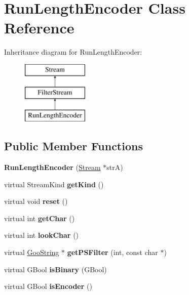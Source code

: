 \hypertarget{class_run_length_encoder}{}\section{Run\+Length\+Encoder Class Reference}
\label{class_run_length_encoder}
Inheritance diagram for Run\+Length\+Encoder\+:\begin{figure}[H]
\begin{center}
\leavevmode
\includegraphics[height=3.000000cm]{class_run_length_encoder}
\end{center}
\end{figure}
\subsection*{Public Member Functions}
\begin{DoxyCompactItemize}
\item 
\mbox{\label{class_run_length_encoder_ae3e57455ae4ceec38435f9ddc8ce8c31}} 
{\bfseries Run\+Length\+Encoder} (\hyperlink{class_stream}{Stream} $\ast$strA)
\item 
\mbox{\label{class_run_length_encoder_a23fbfe5895d1c1e2095e20617d357cbe}} 
virtual Stream\+Kind {\bfseries get\+Kind} ()
\item 
\mbox{\label{class_run_length_encoder_acde8abb807eae233469fd21c65224c64}} 
virtual void {\bfseries reset} ()
\item 
\mbox{\label{class_run_length_encoder_a0fc2c2e73b352a7890311198f5af1780}} 
virtual int {\bfseries get\+Char} ()
\item 
\mbox{\label{class_run_length_encoder_a5e03c376f607e806a06565b681b6017d}} 
virtual int {\bfseries look\+Char} ()
\item 
\mbox{\label{class_run_length_encoder_a238f53eb4e821cffeffc685358ebb2e6}} 
virtual \hyperlink{class_goo_string}{Goo\+String} $\ast$ {\bfseries get\+P\+S\+Filter} (int, const char $\ast$)
\item 
\mbox{\label{class_run_length_encoder_adb2f61cd607df7ddfcb7a3e7f33f201d}} 
virtual G\+Bool {\bfseries is\+Binary} (G\+Bool)
\item 
\mbox{\label{class_run_length_encoder_ac370280434297f1d3241f8fc642ed5a0}} 
virtual G\+Bool {\bfseries is\+Encoder} ()
\end{DoxyCompactItemize}
